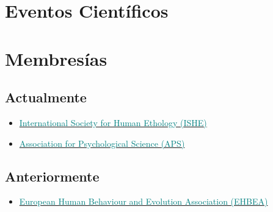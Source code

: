 \documentclass[11pt, a4paper]{awesome-cv}
\providecommand{\tightlist}{%
	\setlength{\itemsep}{0pt}\setlength{\parskip}{0pt}}
\begin{document}
\hypertarget{eventos-cientuxedficos}{%
\section{Eventos Científicos}\label{eventos-cientuxedficos}}

\begin{cventries}
\end{cventries}

\hypertarget{membresuxedas}{%
\section{Membresías}\label{membresuxedas}}

\hypertarget{actualmente}{%
\subsection{Actualmente}\label{actualmente}}

\begin{itemize}
\tightlist
\item
  \href{https://ishe.org/}{\textcolor{teal}{International Society for Human Ethology (ISHE)}}
\item
  \href{https://www.psychologicalscience.org/}{\textcolor{teal}{Association for Psychological Science (APS)}}
\end{itemize}

\hypertarget{anteriormente}{%
\subsection{Anteriormente}\label{anteriormente}}

\begin{itemize}
\tightlist
\item
  \href{https://www.cambridge.org/core/membership/ehbea}{\textcolor{teal}{European Human Behaviour and Evolution Association (EHBEA)}}
\end{itemize}
\end{document}
